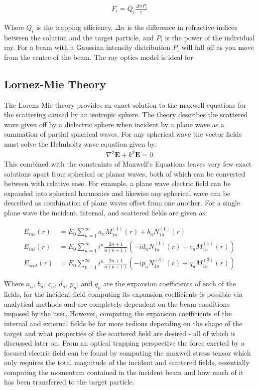 \documentclass[a4paper,oneside,11pt]{book}
\begin{document}
\begin{align}
	F_i = Q_i\frac{\Delta n P_i}{c}
\end{align}

Where $Q_i$ is the trapping efficiency, $\Delta n$ is the difference in refractive indices between the solution and the target particle, and $P_i$ is the power of the individual ray. For a beam with a Gaussian intensity distribution $P_i$ will fall off as you move from the centre of the beam. The ray optics model is ideal for  

\subsection{Lornez-Mie Theory}
The Lorenz Mie theory provides an exact solution to the maxwell equations for the scattering caused by an isotropic sphere. The theory describes the scattered wave given off by a dielectric sphere when incident by a plane wave as a summation of partial spherical waves. For any spherical wave the vector fields must solve the Helmholtz wave equation given by:
\begin{align}
	\nabla^2\boldsymbol{E} +k^2\boldsymbol{E} = 0
\end{align} 
This combined with the constraints of Maxwell's Equations leaves very few exact solutions apart from spherical or planar waves, both of which can be converted between with relative ease. For example, a plane wave electric field can be expanded into spherical harmonics and likewise any spherical wave can be described as combination of plane waves offset from one another. For a single plane wave the incident, internal, and scattered fields are given as:

\begin{align}
	E_{inc}(r) &= E_0 \sum_{n=1}^\infty a_{n}M_{1n}^{(1)}(r)+b_{n}N_{1n}^{(1)}(r) \\
	E_{int}(r) &= E_0 \sum_{n=1}^\infty i^n\frac{2n+1}{n(n+1)}\left(-id_{n}N_{1n}^{(1)}(r)+c_{n}M_{1n}^{(1)}(r)\right) \\
	E_{scat}(r) &= E_0 \sum_{n=1}^\infty  i^n\frac{2n+1}{n(n+1)}\left(-ip_{n}N_{1n}^{(3)}(r)+q_{n}M_{1n}^{(3)}(r)\right)
\end{align}

Where $a_n$, $b_n$, $c_n$, $d_n$, $p_n$, and $q_n$ are the expansion coefficients of each of the fields, for the incident field computing its expansion coefficients is possible via analytical methods and are completely dependent on the beam conditions imposed by the user. However, computing the expansion coefficients of the internal and external fields be far more tedious depending on the shape of the target and what properties of the scattered field are desired - all of which is discussed later on. From an optical trapping perspective the force exerted by a focused electric field can be found by computing the maxwell stress tensor which only requires the total magnitude of the incident and scattered fields, essentially computing the momentum contained in the incident beam and how much of it has been transferred to the target particle. 
\end{document}
